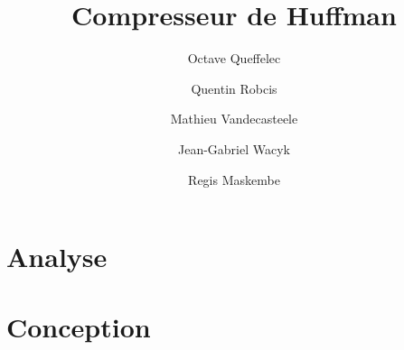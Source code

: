 \documentclass{article}
\title{Compresseur de Huffman}
\author{Octave Queffelec \and Quentin Robcis \and Mathieu Vandecasteele \and Jean-Gabriel Wacyk \and Regis Maskembe}
\begin{document}
\maketitle
\newpage


\tableofcontents
\newpage


\section{Analyse}


\section{Conception}

\end{document}
